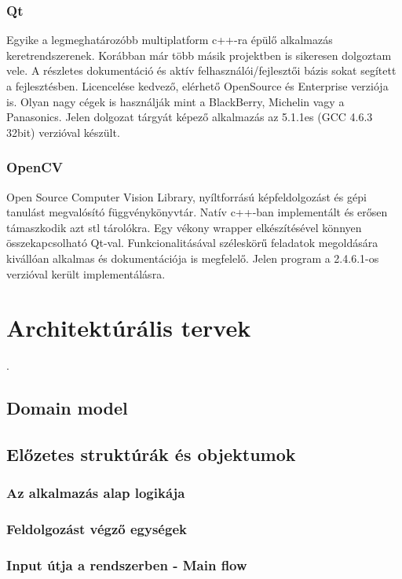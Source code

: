 \documentclass[a4paper,12pt,oneside]{report}
\begin{document}
\subsubsection{Qt}
Egyike a legmeghatározóbb multiplatform c++-ra épülő alkalmazás keretrendszerenek. \cite{website:qt_about} Korábban már több másik projektben is sikeresen dolgoztam vele. A részletes dokumentáció és aktív felhasználói/fejlesztői bázis sokat segített a fejlesztésben. \cite{website:qt_dochome} \cite{website:qt_docforum}\cite{website:qt_docmaillist} Licencelése kedvező, elérhető OpenSource és Enterprise verziója is. Olyan nagy cégek is használják mint a BlackBerry, Michelin vagy a Panasonics.\cite{website:qt_in_use}  Jelen dolgozat tárgyát képező alkalmazás az 5.1.1es (GCC 4.6.3 32bit) verzióval készült.

\subsubsection{OpenCV}	
Open Source Computer Vision Library, nyíltforrású képfeldolgozást és gépi tanulást megvalósító függvénykönyvtár. Natív c++-ban implementált és erősen támaszkodik azt stl tárolókra. Egy vékony wrapper elkészítésével könnyen összekapcsolható Qt-val. Funkcionalitásával széleskörű feladatok megoldására kivállóan alkalmas és dokumentációja is megfelelő. Jelen program a 2.4.6.1-os verzióval került implementálásra.


\section{Architektúrális tervek}
.

\subsection{Domain model}

\subsection{Előzetes struktúrák és objektumok}

\subsubsection{Az alkalmazás alap logikája}
\subsubsection{Feldolgozást végző egységek}
\subsubsection{Input útja a rendszerben - Main flow}
\end{document}
